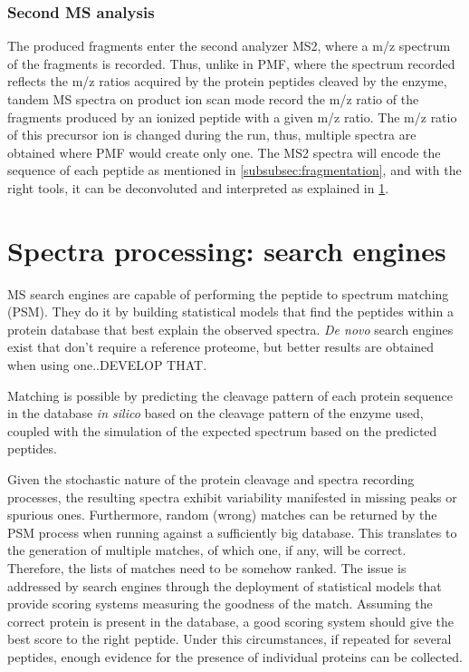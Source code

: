 \documentclass[11pt, a4paper]{report}
\begin{document}
\subsubsection{Second MS analysis}

The produced fragments enter the second analyzer \ac{MS2}, where a m/z spectrum of the fragments is recorded. Thus, unlike in PMF, where the spectrum recorded reflects the m/z ratios acquired by the protein peptides cleaved by the enzyme, tandem MS spectra on product ion scan mode record the m/z ratio of the fragments produced by an ionized peptide with a given m/z ratio. The m/z ratio of this precursor ion is changed during the run, thus, multiple spectra are obtained where PMF would create only one. The \ac{MS2} spectra will encode the sequence of each peptide as mentioned in \ref{subsubsec:fragmentation}, and with the right tools, it can be deconvoluted and interpreted as explained in \ref{sec:search_engines}.


\section{Spectra processing: search engines}
\label{sec:search_engines}

\ac{MS} search engines are capable of performing the peptide to spectrum matching (PSM). They do it by building statistical models that find the peptides within a protein database that best explain the observed spectra. \textit{De novo} search engines exist that don't require a reference proteome, but better results are obtained when using one..DEVELOP THAT.

Matching is possible by predicting the cleavage pattern of each protein sequence in the database \textit{in silico} based on the cleavage pattern of the enzyme used, coupled with the simulation of the expected spectrum based on the predicted peptides.

Given the stochastic nature of the protein cleavage and spectra recording processes, the resulting spectra exhibit variability manifested in missing peaks or spurious ones. Furthermore, random (wrong) matches can be returned by the PSM process when running against a sufficiently big database. This translates to the generation of multiple matches, of which one, if any, will be correct. Therefore, the lists of matches need to be somehow ranked. The issue is addressed by search engines through the deployment of statistical models that provide scoring systems measuring the goodness of the match. Assuming the correct protein is present in the database, a good scoring system should give the best score to the right peptide. Under this circumstances, if repeated for several peptides, enough evidence for the presence of individual proteins can be collected.
\end{document}

